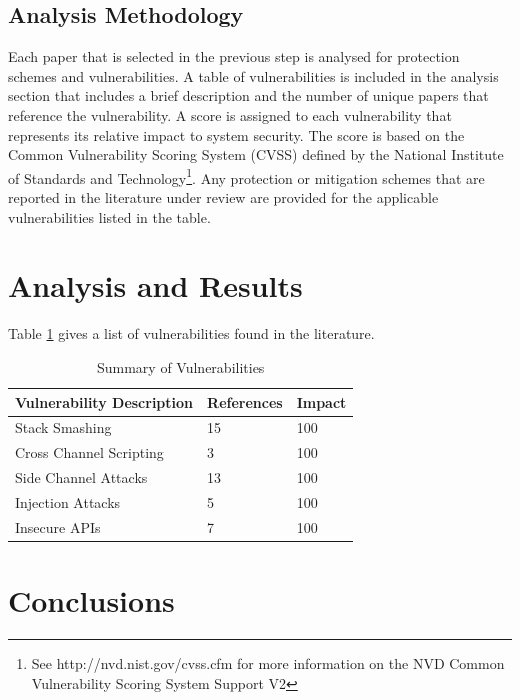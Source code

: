 \documentclass[final,conference,10pt]{IEEEtran}
\begin{document}
\subsection{Analysis Methodology}

Each paper that is selected in the previous step is analysed for protection schemes and vulnerabilities.  A table of vulnerabilities is included in the analysis section that includes a brief description and the number of unique papers that reference the vulnerability. A score is assigned to each vulnerability that represents its relative impact to system security. The score is based on the Common Vulnerability Scoring System (CVSS) defined by the National Institute of Standards and Technology\footnote{See http://nvd.nist.gov/cvss.cfm for more information on the NVD Common Vulnerability Scoring System Support V2}.  Any protection or mitigation schemes that are reported in the literature under review are provided for the applicable vulnerabilities listed in the table.  

\section{Analysis and Results}

Table \ref{tab:vul_summary} gives a list of vulnerabilities found in the literature.

\begin{table}[!t]
\renewcommand{\arraystretch}{1.3}
\caption{Summary of Vulnerabilities}
\label{tab:vul_summary}
\centering
\begin{tabular}{ | p{5cm} | l | l | }
\hline
 Vulnerability Description 		& References & Impact	\\ \hline
 Stack Smashing					& 15 & 100 				\\ \hline
 Cross Channel Scripting			& 3 & 100				\\ \hline
 Side Channel Attacks 			& 13 & 100 				\\ \hline
 Injection Attacks				& 5 & 100 				\\ \hline
 Insecure APIs 					& 7 & 100				\\ \hline
\end{tabular}
\end{table}

\section{Conclusions}
\end{document}
